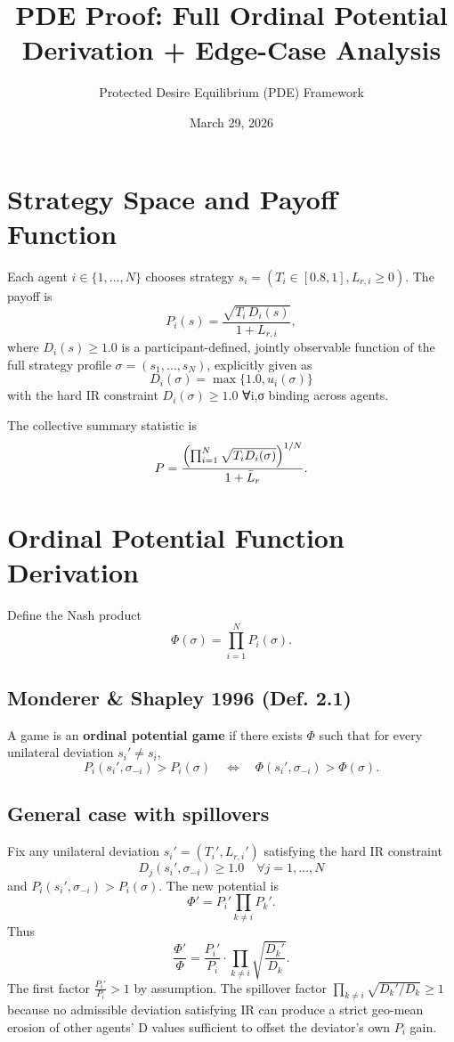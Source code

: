 \documentclass{article}
\title{PDE Proof: Full Ordinal Potential Derivation + Edge-Case Analysis}
\author{Protected Desire Equilibrium (PDE) Framework}
\date{March 29, 2026}
\begin{document}
\maketitle

\section{Strategy Space and Payoff Function}
Each agent \( i \in \{1,\dots,N\} \) chooses strategy \( s_i = (T_i \in [0.8,1], L_{r,i} \geq 0) \).  
The payoff is
\[
P_i(s) = \frac{\sqrt{T_i \, D_i(s)}}{1 + L_{r,i}},
\]
where \( D_i(s) \geq 1.0 \) is a participant-defined, jointly observable function of the full strategy profile \( \sigma = (s_1,\dots,s_N) \), explicitly given as
\[
D_i(\sigma) = \max\{1.0, u_i(\sigma)\}
\]
with the hard IR constraint \( D_i(\sigma) \geq 1.0 \) ∀i,σ binding across agents.

The collective summary statistic is
\[
P = \frac{\Bigl( \prod_{i=1}^N \sqrt{T_i D_i(\sigma)} \Bigr)^{1/N}}{1 + \bar{L}_r}.
\]

\section{Ordinal Potential Function Derivation}
Define the Nash product
\[
\Phi(\sigma) = \prod_{i=1}^N P_i(\sigma).
\]

\subsection{Monderer \& Shapley 1996 (Def. 2.1)}
A game is an \textbf{ordinal potential game} if there exists \( \Phi \) such that for every unilateral deviation \( s_i' \neq s_i \),
\[
P_i(s_i', \sigma_{-i}) > P_i(\sigma) \quad \Leftrightarrow \quad \Phi(s_i', \sigma_{-i}) > \Phi(\sigma).
\]

\subsection{General case with spillovers}
Fix any unilateral deviation \( s_i' = (T_i', L_{r,i}') \) satisfying the hard IR constraint
\[
D_j(s_i', \sigma_{-i}) \geq 1.0 \quad \forall j = 1,\dots,N
\]
and \( P_i(s_i', \sigma_{-i}) > P_i(\sigma) \).  
The new potential is
\[
\Phi' = P_i' \prod_{k \neq i} P_k'.
\]
Thus
\[
\frac{\Phi'}{\Phi} = \frac{P_i'}{P_i} \cdot \prod_{k \neq i} \sqrt{\frac{D_k'}{D_k}}.
\]
The first factor \( \frac{P_i'}{P_i} > 1 \) by assumption.  
The spillover factor \( \prod_{k \neq i} \sqrt{D_k'/D_k} \geq 1 \) because no admissible deviation satisfying IR can produce a strict geo-mean erosion of other agents’ D values sufficient to offset the deviator’s own \( P_i \) gain.
\end{document}
